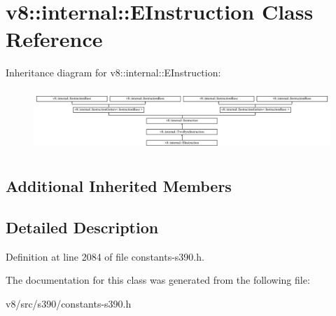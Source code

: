 \hypertarget{classv8_1_1internal_1_1EInstruction}{}\section{v8\+:\+:internal\+:\+:E\+Instruction Class Reference}
\label{classv8_1_1internal_1_1EInstruction}
Inheritance diagram for v8\+:\+:internal\+:\+:E\+Instruction\+:\begin{figure}[H]
\begin{center}
\leavevmode
\includegraphics[height=2.364865cm]{classv8_1_1internal_1_1EInstruction}
\end{center}
\end{figure}
\subsection*{Additional Inherited Members}


\subsection{Detailed Description}


Definition at line 2084 of file constants-\/s390.\+h.



The documentation for this class was generated from the following file\+:\begin{DoxyCompactItemize}
\item 
v8/src/s390/constants-\/s390.\+h\end{DoxyCompactItemize}
